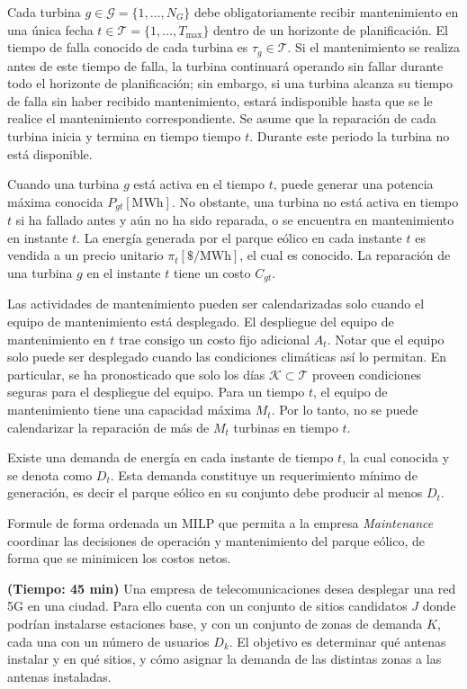 \documentclass[
	spanish, %
	letterpaper, oneside
]{article}
\begin{document}
Cada turbina $g \in \mathcal{G}=\{1,\ldots,N_G\}$ debe obligatoriamente recibir mantenimiento en una única fecha $t \in \mathcal{T}=\{1,\ldots,T_{\max}\}$ dentro de un horizonte de planificación. El tiempo de falla conocido de cada turbina es $\tau_g \in \mathcal{T}$. Si el mantenimiento se realiza antes de este tiempo de falla, la turbina continuará operando sin fallar durante todo el horizonte de planificación; sin embargo, si una turbina alcanza su tiempo de falla sin haber recibido mantenimiento, estará indisponible hasta que se le realice el mantenimiento correspondiente. Se asume que la reparación de cada turbina inicia y termina en tiempo tiempo $t$. Durante este periodo la turbina no está disponible.

Cuando una turbina $g$ está activa en el tiempo $t$, puede generar una potencia máxima conocida $P_{gt}[\mathrm{MWh}]$. No obstante, una turbina no está activa en tiempo $t$ si  ha fallado antes y aún no ha sido reparada, o se encuentra en mantenimiento en instante $t$. La energía generada por el parque eólico en cada instante $t$ es vendida a un precio unitario 
$\pi_t[\$/\mathrm{MWh}]$, el cual es conocido. La reparación de una turbina $g$ en el instante $t$ tiene un costo $C_{gt}$.

Las actividades de mantenimiento pueden ser calendarizadas solo cuando el equipo de mantenimiento está desplegado. El despliegue del equipo de mantenimiento en $t$ trae consigo un costo fijo adicional $A_t$. Notar que el equipo solo puede ser desplegado cuando las condiciones climáticas así lo permitan. En particular, se ha pronosticado que solo los días $\mathcal{K} \subset \mathcal{T}$ proveen condiciones seguras para el despliegue del equipo. Para un tiempo $t$, el equipo de mantenimiento tiene una capacidad máxima $M_t$. Por lo tanto, no se puede calendarizar la reparación de más de $M_t$ turbinas en tiempo $t$.


Existe una demanda de energía en cada instante de tiempo $t$, la cual conocida y se denota como $D_t$. Esta demanda constituye un requerimiento mínimo de generación, es decir el parque eólico en su conjunto debe producir al menos $D_t$.

Formule de forma ordenada un MILP que permita a la empresa \textit{Maintenance} coordinar las decisiones de operación y mantenimiento del parque eólico, de forma que se minimicen los costos netos. 




{} \textbf{(Tiempo: 45 min)} Una empresa de telecomunicaciones desea desplegar una red 5G en una ciudad. Para ello cuenta con un conjunto de sitios candidatos $J$ donde podrían instalarse estaciones base, y con un conjunto de zonas de demanda $K$, cada una con un número de usuarios $D_k$. El objetivo es determinar qué antenas instalar y en qué sitios, y cómo asignar la demanda de las distintas zonas a las antenas instaladas.
\end{document}
